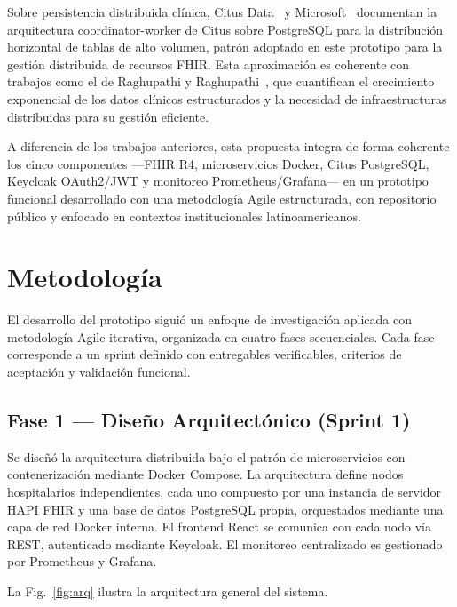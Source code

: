 \documentclass[conference]{IEEEtran}
\begin{document}
Sobre persistencia distribuida cl\'inica, Citus Data~\cite{b6} y
Microsoft~\cite{b7} documentan la arquitectura coordinator-worker de
Citus sobre PostgreSQL para la distribuci\'on horizontal de tablas
de alto volumen, patr\'on adoptado en este prototipo para la gesti\'on
distribuida de recursos FHIR. Esta aproximaci\'on es coherente con
trabajos como el de Raghupathi y Raghupathi~\cite{bbigdata}, que
cuantifican el crecimiento exponencial de los datos cl\'inicos
estructurados y la necesidad de infraestructuras distribuidas para
su gesti\'on eficiente.

A diferencia de los trabajos anteriores, esta propuesta integra de
forma coherente los cinco componentes ---FHIR R4, microservicios Docker,
Citus PostgreSQL, Keycloak OAuth2/JWT y monitoreo Prometheus/Grafana---
en un prototipo funcional desarrollado con una metodolog\'ia Agile
estructurada, con repositorio p\'ublico y enfocado en contextos
institucionales latinoamericanos.

\section{Metodolog\'ia}

El desarrollo del prototipo sigui\'o un enfoque de investigaci\'on
aplicada con metodolog\'ia Agile iterativa, organizada en cuatro fases
secuenciales. Cada fase corresponde a un sprint definido con entregables
verificables, criterios de aceptaci\'on y validaci\'on funcional.

\subsection{Fase 1 --- Dise\~no Arquitect\'onico (Sprint 1)}

Se dise\~n\'o la arquitectura distribuida bajo el patr\'on de
microservicios con contenerizaci\'on mediante Docker Compose. La
arquitectura define nodos hospitalarios independientes, cada uno
compuesto por una instancia de servidor HAPI FHIR y una base de datos
PostgreSQL propia, orquestados mediante una capa de red Docker interna.
El frontend React se comunica con cada nodo v\'ia REST, autenticado
mediante Keycloak. El monitoreo centralizado es gestionado por
Prometheus y Grafana.

La Fig.~\ref{fig:arq} ilustra la arquitectura general del sistema.
\end{document}
